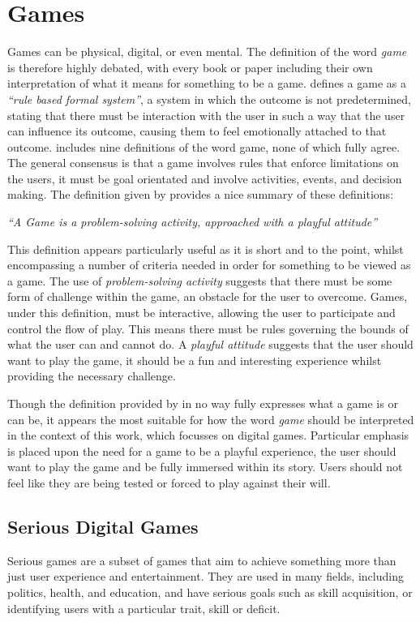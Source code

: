 \documentclass[journal]{IEEEtran}
\newcommand{\inquote}[1]{\textit{``#1''}}
\newcommand{\cquote}[1]{\begin{center}
						\inquote{#1}
					\end{center}	
					}
\begin{document}
\section{Games}
\label{sec:games}
Games can be physical, digital, or even mental. The definition of the word \emph{game} is therefore highly debated, with every book or paper including their own interpretation of what it means for something to be a game. \cite{halfReal} defines a game as a \emph{``rule based formal system''}, a system in which the outcome is not predetermined, stating that there must be interaction with the user in such a way that the user can influence its outcome, causing them to feel emotionally attached to that outcome. \cite{rulesOfPlay} includes nine definitions of the word game, none of which fully agree. The general consensus is that a game involves rules that enforce limitations on the users, it must be goal orientated and involve activities, events, and decision making. The definition given by \cite{artOfGameDesign} provides a nice summary of these definitions: 
\cquote{A Game is a problem-solving activity, approached with a playful
attitude}

This definition appears particularly useful as it is short and to the point, whilst encompassing a number of criteria needed in order for something to be viewed as a game. The use of \textit{problem-solving activity} suggests that there must be some form of challenge within the game, an obstacle for the user to overcome. Games, under this definition, must be interactive, allowing the user to participate and control the flow of play. This means there must be rules governing the bounds of what the user can and cannot do. A \textit{playful attitude} suggests that the user should want to play the game, it should be a fun and interesting experience whilst providing the necessary challenge.

Though the definition provided by \cite{artOfGameDesign} in no way fully expresses what a game is or can be, it appears the most suitable for how the word \emph{game} should be interpreted in the context of this work, which focusses on digital games. Particular emphasis is placed upon the need for a game to be a playful experience, the user should want to play the game and be fully immersed within its story. Users should not feel like they are being tested or forced to play against their will.

\subsection{Serious Digital Games}
Serious games are a subset of games that aim to achieve something more than just user experience and entertainment\cite{stegeserious}. They are used in many fields, including politics, health, and education, and have serious goals such as skill acquisition, or identifying users with a particular trait, skill or deficit\cite{SeriousOverview}.
 
\end{document}
